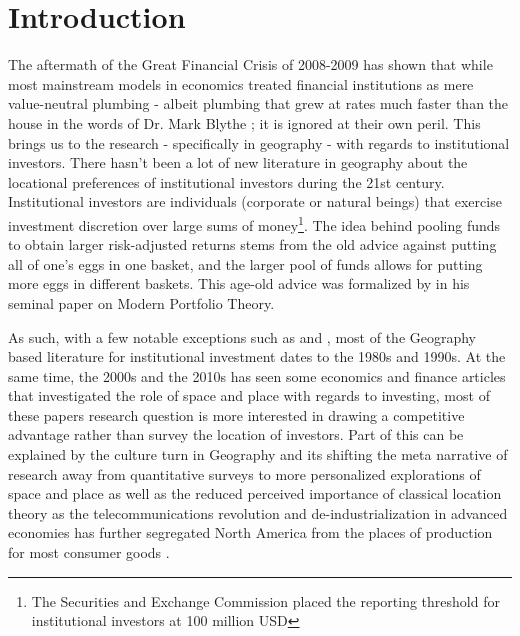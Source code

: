 \chapter{Introduction}
\label{ChapterI}

The aftermath of the Great Financial Crisis of 2008-2009 has shown that while most mainstream models in economics treated financial institutions as mere value-neutral plumbing - albeit plumbing that grew at rates much faster than the house in the words of Dr. Mark Blythe ; it is ignored at their own peril.  This brings us to the research - specifically in geography - with regards to institutional investors. There hasn't been a lot of new literature in geography about the locational preferences of institutional investors during the 21st century. Institutional investors are individuals (corporate or natural beings) that exercise investment discretion over large sums of money\footnote{The Securities and Exchange Commission placed the reporting threshold for institutional investors at 100 million USD}\citep{SEC2013}.  The idea behind pooling funds to obtain larger risk-adjusted returns stems from the old advice against putting all of one's eggs in one basket, and the larger pool of funds allows for putting more eggs in different baskets.  This age-old advice was formalized by \cite{Markowitz1952} in his seminal paper on Modern Portfolio Theory.  


As such, with a few notable exceptions such as \cite{Graves2003,gongthe2012} and \cite{GreenOLef2014}, most of the Geography based literature for institutional investment dates to the 1980s and 1990s.  At the same time, the 2000s and the 2010s has seen some economics and finance articles that investigated the role of space and place with regards to investing, most of these papers research question is more interested in drawing a competitive advantage rather than survey the location of investors.  Part of this can be explained by the culture turn in Geography and its shifting the meta narrative of research away from quantitative surveys to more personalized explorations of space and place as well as the reduced perceived importance of classical location theory as the telecommunications revolution and de-industrialization in advanced economies has further segregated North America from the places of production for most consumer goods \citep{bryson1999economic}.    

